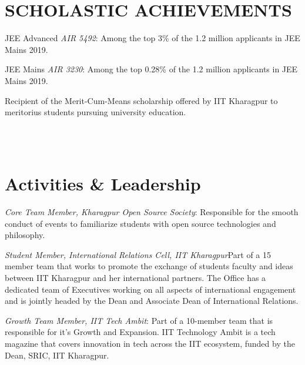 \documentclass[]{deedy-resume-openfont}
\begin{document}
\begin{minipage}[t]{0.66\textwidth}
\section{SCHOLASTIC ACHIEVEMENTS}

\vspace{\topsep} %
\begin{tightemize}

\item{JEE Advanced \emph{AIR 5492}:} Among the top 3\% of the 1.2 million applicants in JEE Mains 2019.
\vspace{\topsep} %
\item{JEE Mains \emph{AIR 3230}:} Among the top 0.28\% of the 1.2 million applicants in JEE Mains 2019. 
\vspace{\topsep} %
\item Recipient of the Merit-Cum-Means scholarship offered by IIT Kharagpur to meritorius students pursuing university education.
\end{tightemize}

\\~\\


\section{Activities \& Leadership}

\vspace{\topsep} %
\begin{tightemize}


\item {\emph{Core Team Member, Kharagpur Open Source Society}:} Responsible for the smooth conduct of events to familiarize students with open source technologies and philosophy.
\vspace{\topsep} %
\item{\emph{Student Member, International Relations Cell, IIT Kharagpur}}Part of a 15 member team that works to promote the exchange of students faculty and ideas between IIT Kharagpur and her international partners. The Office has a dedicated team of Executives working on all aspects of international engagement and is jointly headed by the Dean and Associate Dean of International Relations. \vspace{\topsep} %
\item {\emph{Growth Team Member, IIT Tech Ambit}:} Part of a 10-member team that is responsible for it’s Growth and Expansion. IIT Technology Ambit is a tech magazine that covers innovation in tech across the IIT ecosystem, funded by the Dean, SRIC, IIT Kharagpur.

\end{tightemize}
\sectionsep

\end{minipage} 
\end{document}

